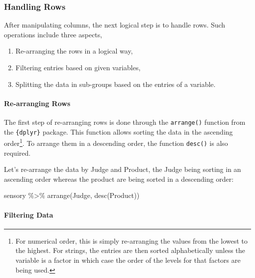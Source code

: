 \documentclass[
]{book}
\newenvironment{Shaded}{\begin{snugshade}}{\end{snugshade}}
\newcommand{\FunctionTok}[1]{\textcolor[rgb]{0.00,0.00,0.00}{#1}}
\newcommand{\NormalTok}[1]{#1}
\newcommand{\SpecialCharTok}[1]{\textcolor[rgb]{0.00,0.00,0.00}{#1}}
\providecommand{\tightlist}{%
  \setlength{\itemsep}{0pt}\setlength{\parskip}{0pt}}
\begin{document}
\hypertarget{handling-rows}{%
\subsubsection{Handling Rows}\label{handling-rows}}

After manipulating columns, the next logical step is to handle rows. Such operations include three aspects,

\begin{enumerate}
\def\labelenumi{\arabic{enumi}.}
\tightlist
\item
  Re-arranging the rows in a logical way,
\item
  Filtering entries based on given variables,
\item
  Splitting the data in sub-groups based on the entries of a variable.
\end{enumerate}

\hypertarget{re-arranging-rows}{%
\paragraph{Re-arranging Rows}\label{re-arranging-rows}}

The first step of re-arranging rows is done through the \texttt{arrange()} function from the \texttt{\{dplyr\}} package. This function allows sorting the data in the ascending order\footnote{For numerical order, this is simply re-arranging the values from the lowest to the highest. For strings, the entries are then sorted alphabetically unless the variable is a factor in which case the order of the levels for that factors are being used.}. To arrange them in a descending order, the function \texttt{desc()} is also required.

Let's re-arrange the data by Judge and Product, the Judge being sorting in an ascending order whereas the product are being sorted in a descending order:

\begin{Shaded}
\begin{Highlighting}[]
\NormalTok{sensory }\SpecialCharTok{\%\textgreater{}\%} 
  \FunctionTok{arrange}\NormalTok{(Judge, }\FunctionTok{desc}\NormalTok{(Product))}
\end{Highlighting}
\end{Shaded}

\hypertarget{filtering-data}{%
\paragraph{Filtering Data}\label{filtering-data}}
\end{document}
